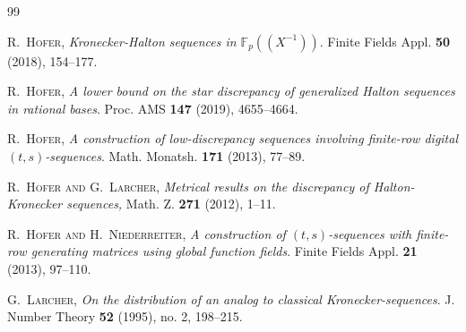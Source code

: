 \documentclass{article}
\newcommand{\FF}{\mathbb{F}}
\renewcommand{\(}{\left (}
\renewcommand{\)}{\right )}
\theoremstyle{definition}
\numberwithin{equation}{section}
\begin{document}
\begin{thebibliography}{99}




 \textsc{R.~Hofer}, \textit{Kronecker-Halton sequences in $\FF_p((X^{-1}))$}. {Finite Fields Appl.} {\bf50} (2018), 154--177.

 \textsc{R.~Hofer}, \textit{A lower bound on the star discrepancy of generalized Halton sequences in rational bases}. {Proc. AMS} {\bf147} (2019), 4655--4664.

 \textsc{R.~Hofer}, \emph{A construction of low-discrepancy sequences involving finite-row digital $(t,s)$-sequences}. {{Math. Monatsh.}} {\bf171} (2013), 77--89.




 \textsc{R.~Hofer and G.~Larcher},
 \textit{Metrical results on the discrepancy of {H}alton-{K}ronecker
  sequences,}
 { Math. Z.} {\bf271} (2012), 1--11.

\textsc{R.~Hofer and H.~Niederreiter}, \textit{A construction of $(t,s)$-sequences with finite-row generating matrices using global function fields}. {{Finite Fields Appl.}} {\bf21} (2013), 97--110. 

\textsc{G.~Larcher}, \textit{On the distribution of an analog to classical Kronecker-sequences}.
J. Number Theory {\bf52} (1995), no. 2, 198--215.


\end{thebibliography}
\end{document}
